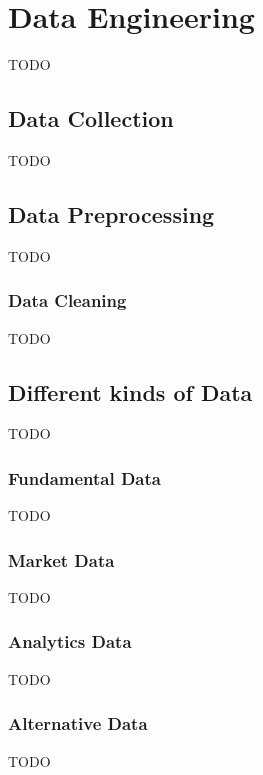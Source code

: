 

\chapter{Data Engineering}\label{ch:data-engineering}
TODO


\section{Data Collection}\label{sec:data-collection}
TODO


\section{Data Preprocessing}\label{sec:data-preprocessing}
TODO

\subsection{Data Cleaning}\label{subsec:data-cleaning}
TODO


\section{Different kinds of Data}\label{sec:different-kinds-of-data}
TODO

\subsection{Fundamental Data}\label{subsec:fundamental-data}
TODO

\subsection{Market Data}\label{subsec:market-data}
TODO

\subsection{Analytics Data}\label{subsec:analytics-data}
TODO

\subsection{Alternative Data}\label{subsec:alternative-data}
TODO




